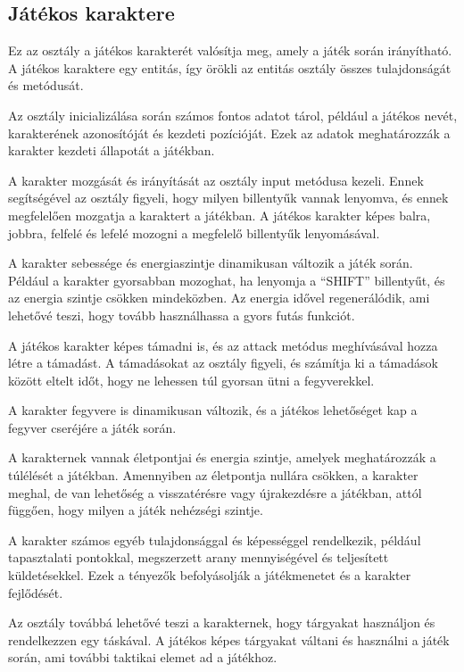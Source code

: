                     
\subsection{Játékos karaktere}
 Ez az osztály a játékos karakterét valósítja meg, amely a játék során irányítható. A játékos karaktere egy entitás, így örökli az entitás osztály összes tulajdonságát és metódusát.

Az osztály inicializálása során számos fontos adatot tárol, például a játékos nevét, karakterének azonosítóját és kezdeti pozícióját. Ezek az adatok meghatározzák a karakter kezdeti állapotát a játékban.

A karakter mozgását és irányítását az osztály input metódusa kezeli. Ennek segítségével az osztály figyeli, hogy milyen billentyűk vannak lenyomva, és ennek megfelelően mozgatja a karaktert a játékban. A játékos karakter képes balra, jobbra, felfelé és lefelé mozogni a megfelelő billentyűk lenyomásával.

A karakter sebessége és energiaszintje dinamikusan változik a játék során. Például a karakter gyorsabban mozoghat, ha lenyomja a ``SHIFT'' billentyűt, és az energia szintje csökken mindeközben. Az energia idővel regenerálódik, ami lehetővé teszi, hogy tovább használhassa a gyors futás funkciót.

A játékos karakter képes támadni is, és az attack metódus meghívásával hozza létre a támadást. A támadásokat az osztály figyeli, és számítja ki a támadások között eltelt időt, hogy ne lehessen túl gyorsan ütni a fegyverekkel.

A karakter fegyvere is dinamikusan változik, és a játékos lehetőséget kap a fegyver cseréjére a játék során.

A karakternek vannak életpontjai és energia szintje, amelyek meghatározzák a túlélését a játékban. Amennyiben az életpontja nullára csökken, a karakter meghal, de van lehetőség a visszatérésre vagy újrakezdésre a játékban, attól függően, hogy milyen a játék nehézségi szintje.

A karakter számos egyéb tulajdonsággal és képességgel rendelkezik, például tapasztalati pontokkal, megszerzett arany mennyiségével és teljesített küldetésekkel. Ezek a tényezők befolyásolják a játékmenetet és a karakter fejlődését.

Az osztály továbbá lehetővé teszi a karakternek, hogy tárgyakat használjon és rendelkezzen egy táskával. A játékos képes tárgyakat váltani és használni a játék során, ami további taktikai elemet ad a játékhoz.

